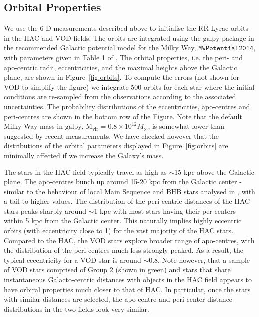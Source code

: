 \documentclass[fleqn,usenatbib]{mnras}
\begin{document}
\subsection{Orbital Properties}

We use the 6-D measurements described above to initialise the RR Lyrae
orbits in the HAC and VOD fields. The orbits are integrated using the
$\mathrm{galpy}$ package \citep{Bovy2015} in the recommended Galactic
potential model for the Milky Way, $\texttt{MWPotential2014}$, with
parameters given in Table 1 of \citet{Bovy2015}. The orbital
properties, i.e. the peri- and apo-centric radii, eccentricities, and
the maximal heights above the Galactic plane, are shown in
Figure~\ref{fig:orbits}. To compute the errors (not shown for VOD to
simplify the figure) we integrate 500 orbits for each star where the
initial conditions are re-sampled from the observations according to
the associated uncertainties. The probability distributions of the
eccentricities, apo-centres and peri-centres are shown in the bottom
row of the Figure. Note that the default Milky Way mass in
$\mathrm{galpy}$, $\mathrm{M_{vir}} = 0.8 \times 10^{12} M_{\odot}$,
is somewhat lower than suggested by recent measurements.  We have
checked however that the distributions of the orbital parameters
displayed in Figure~\ref{fig:orbits} are minimally affected if we
increase the Galaxy's mass.

The stars in the HAC field typically travel as high as $\sim$15 kpc
above the Galactic plane. The apo-centres bunch up around 15-20 kpc
from the Galactic center - similar to the behaviour of local Main
Sequence and BHB stars analysed in \citet{Deason2018pileup}, with a
tail to higher values. The distribution of the peri-centric distances
of the HAC stars peaks sharply around $\sim$1 kpc with most stars
having their per-centers within 5 kpc from the Galactic center. This
naturally implies highly eccentric orbits (with eccentricity close to
1) for the vast majority of the HAC stars. Compared to the HAC, the
VOD stars explore broader range of apo-centres, with the distribution
of the peri-centres much less strongly peaked. As a result, the
typical eccentricity for a VOD star is around $\sim$0.8. Note however,
that a sample of VOD stars comprised of Group 2 (shown in green) and
stars that share instantaneous Galacto-centric distances with objects
in the HAC field appears to have orbiral properties much closer to
that of HAC. In particular, once the stars with similar distances are
selected, the apo-centre and peri-center distance distributions in the
two fields look very similar.
\end{document}
